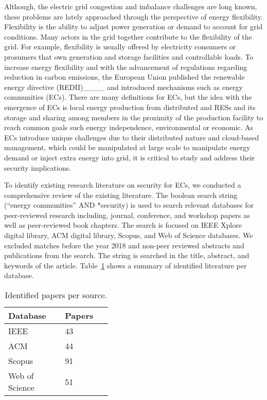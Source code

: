 Although, the electric grid congestion and imbalance challenges are long known, these problems are lately approached through the perspective of energy flexibility. Flexibility is the ability to adjust power generation or demand to account for grid conditions. Many actors in the grid together contribute to the flexibility of the grid. For example, flexibility is usually offered by electricity consumers or prosumers that own generation and storage facilities and controllable loads. To increase energy flexibility and with the advancement of regulations regarding  reduction in carbon emissions, the European Union published the renewable energy directive (REDII)____ and introduced mechanisms such as energy communities (ECs). There are many definitions for ECs, but the idea with the emergence of ECs is local energy production from distributed and RESs and its storage and sharing among members in the proximity of the production facility to reach common goals such energy independence, environmental or economic. As ECs introduce unique challenges due to their distributed nature and cloud-based management, which could be manipulated at large scale to manipulate energy demand or inject extra energy into grid, it is critical to study and address their security implications. 

To identify existing research literature on security for ECs, we conducted a comprehensive review of the existing literature. The boolean search string (``energy communities” AND *security) is used to search relevant databases for peer-reviewed research including, journal, conference, and workshop papers as well as peer-reviewed book chapters. The search is focused on IEEE Xplore digital library, ACM digital library, Scopus, and Web of Science databases. We excluded matches before the year 2018 and non-peer reviewed abstracts and publications from the search. The string is searched in the title, abstract, and keywords of the article. Table~\ref{tab:papers} shows a summary of identified literature per database. 

\begin{table}[htbp!] 
\centering
\caption{Identified papers per source.}
\begin{tabular}{| p{0.2\linewidth} | p{0.2\linewidth} |}
\hline
\textbf{Database} & \textbf{Papers} 
\\ \hline
IEEE & 43 \\ \hline
ACM & 44 \\ \hline
Scopus & 91 \\ \hline
Web of Science & 51 \\ \hline
\end{tabular}
\centering
\label{tab:papers}
\end{table}

